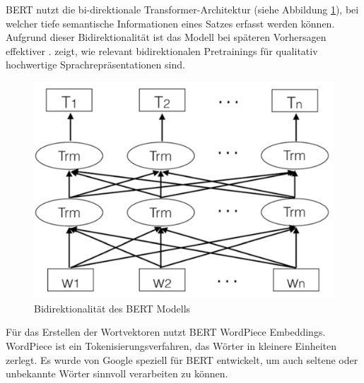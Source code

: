 BERT nutzt die bi-direktionale Transformer-Architektur (siehe Abbildung \ref{fig:architecture_bert}), bei welcher tiefe semantische Informationen 
eines Satzes erfasst werden können. Aufgrund dieser Bidirektionalität ist das Modell bei späteren Vorhersagen effektiver \cite{wettig2023}. 
\cite{devlin2019} zeigt, wie relevant bidirektionalen Pretrainings für qualitativ hochwertige Sprachrepräsentationen sind.

\begin{figure}[htbp]
    \begin{center}
        \includegraphics[scale=0.3]{static/architecture_bert.png}
        \caption{\label{fig:architecture_bert} Bidirektionalität des BERT Modells \cite{Wang:2020aa}}
    \end{center}
\end{figure}

Für das Erstellen der Wortvektoren nutzt BERT WordPiece Embeddings.
WordPiece ist ein Tokenisierungsverfahren, das Wörter in kleinere Einheiten zerlegt.
Es wurde von Google speziell für BERT entwickelt, um auch seltene oder unbekannte Wörter sinnvoll verarbeiten zu können.

